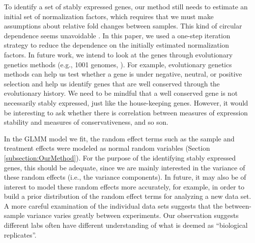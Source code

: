 \documentclass[letterpaper,12pt]{article}
\begin{document}

To identify a set of stably expressed genes, our method still needs to estimate
an initial set of normalization factors, which requires that we must make assumptions 
about relative fold changes between samples. This kind of circular dependence
seems unavoidable \citep{vandesompele2002accurate}. In this paper, we used a
one-step iteration strategy to reduce the dependence on the initially
estimated normalization factors.  
In future work, we intend to look at the genes through evolutionary genetics
methods (e.g., 1001 genomes, \cite{weigel20091001}).  For example, evolutionary genetics methods can
help us test whether a gene is under negative, neutral, or positive selection
and help us identify genes that are well conserved through the evolutionary
history. We need to be mindful that a well conserved gene is not necessarily
stably expressed, just like the house-keeping genes. However, it would be
interesting to ask whether there is correlation between measures of expression
stability and measures of conservativeness, and so son.


In the GLMM model we fit, the random effect terms such as the sample and treatment
effects were modeled as normal random variables (Section
\ref{subsection:OurMethod}). For the purpose of the identifying stably
expressed genes, this should be adequate, since we are mainly interested in
the variance of these random effects (i.e., the variance components). In
future, it may also be of interest to model these random effects more
accurately, for example, in order to build a prior distribution of the random
effect terms for analyzing a new data set. A more careful examination of the
individual data sets suggests that the between-sample variance varies greatly
between experiments. Our observation suggests different labs often have
different understanding of what is deemed as ``biological replicates''.
\end{document}
